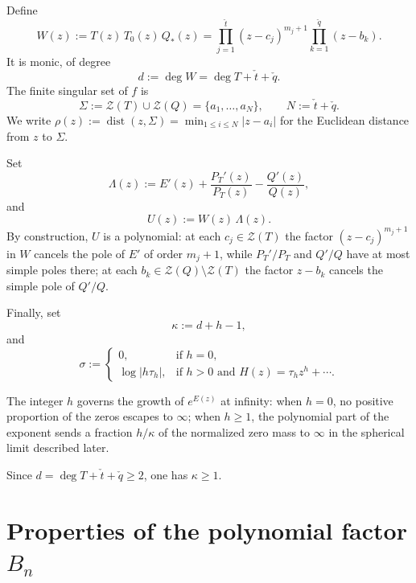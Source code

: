 \documentclass[reqno]{article}
\theoremstyle{definition}
\theoremstyle{remark}
\theoremstyle{plain}
\newcommand{\Z}{\mathcal Z}
\begin{document}
Define
\begin{equation}\label{eq:Wdef}
W(z):=T(z)\,T_0(z)\,Q_\ast(z)=\prod_{j=1}^{\check t}(z-c_j)^{m_j+1}\prod_{k=1}^{\check q}(z-b_k).
\end{equation}
It is monic, of degree
\begin{equation}\label{eq:ddef}
d:=\deg W=\deg T+\check t+\check q.
\end{equation}
The finite singular set of $f$ is
\begin{equation}\label{eq:Sigmadef}
\Sigma:=\Z(T)\cup \Z(Q)=\{a_1,\dots,a_N\},\qquad N:=\check t+\check q.
\end{equation}
We write $\rho(z):=\operatorname{dist}(z,\Sigma)=\min_{1\le i\le N}|z-a_i|$ for the Euclidean distance from $z$ to $\Sigma$.

Set
\begin{equation}\label{eq:Lambdadef}
\Lambda(z):=E'(z)+\frac{P_T'(z)}{P_T(z)}-\frac{Q'(z)}{Q(z)},
\end{equation}
and
\begin{equation}\label{eq:Udef}
U(z):=W(z)\,\Lambda(z).
\end{equation}
By construction, $U$ is a polynomial: at each $c_j\in \Z(T)$ the factor $(z-c_j)^{m_j+1}$ in $W$ cancels the pole of $E'$ of order $m_j+1$, while $P_T'/P_T$ and $Q'/Q$ have at most simple poles there; at each $b_k\in \Z(Q)\setminus \Z(T)$ the factor $z-b_k$ cancels the simple pole of $Q'/Q$.

Finally, set
\begin{equation}\label{eq:kappadef}
\kappa:=d+h-1,
\end{equation}
and
\begin{equation}\label{eq:sigmadef}
\sigma:=
\begin{cases}
0, & \text{if } h=0,\\
\log|h\tau_h|, & \text{if } h>0 \text{ and } H(z)=\tau_h z^h+\cdots.
\end{cases}
\end{equation}

The integer $h$ governs the growth of $e^{E(z)}$ at infinity: when $h=0$, no positive proportion of the zeros escapes to $\infty$; when $h\ge1$, the polynomial part of the exponent sends a fraction $h/\kappa$ of the normalized zero mass to $\infty$ in the spherical limit described later.

Since $d=\deg T+\check t+\check q\ge2$, one has $\kappa\ge1$.

\section{Properties of the polynomial factor \texorpdfstring{$B_n$}{B\_n}}\label{sec:rec}
\end{document}
